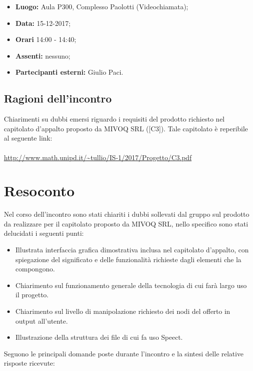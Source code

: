 \documentclass[openany,12pt,a4paper]{article}
\begin{document}
	\begin{itemize} 
	    \item \textbf{Luogo:} Aula P300, Complesso Paolotti (Videochiamata);
	    \item \textbf{Data:} 15-12-2017;
	    \item \textbf{Orari} 14:00 - 14:40;
	    \item \textbf{Assenti:} nessuno;
	    \item \textbf{Partecipanti esterni:} Giulio Paci.
	\end{itemize}
	
	\subsection{Ragioni dell'incontro}
	
	Chiarimenti su dubbi emersi riguardo i requisiti del prodotto richiesto nel capitolato d'appalto proposto da MIVOQ SRL ([C3]). Tale capitolato è reperibile al seguente link:
	\\ 
	\\ \url{http://www.math.unipd.it/~tullio/IS-1/2017/Progetto/C3.pdf}
	
	\section{Resoconto}
	
	Nel corso dell'incontro sono stati chiariti i dubbi sollevati dal gruppo sul prodotto da realizzare per il capitolato proposto da MIVOQ SRL, nello specifico sono stati delucidati i seguenti punti:
	
	\begin{itemize}
	    \item Illustrata interfaccia grafica dimostrativa inclusa nel capitolato d'appalto, con spiegazione del significato e delle funzionalità richieste dagli elementi che la compongono.
	    \item Chiarimento sul funzionamento generale della tecnologia  di cui farà largo uso il progetto.
	    \item Chiarimento sul livello di manipolazione richiesto dei nodi del  offerto in output all'utente.
	    \item Illustrazione della struttura dei file  di cui fa uso Speect.
	\end{itemize}
	
	Seguono le principali domande poste durante l'incontro e la sintesi delle relative risposte ricevute:
	
\end{document}
